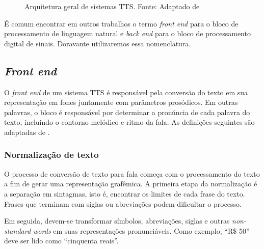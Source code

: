 \begin{figure}[!htbp]
\centering
{}
\caption[Arquitetura geral de sistemas TTS]{Arquitetura geral de sistemas TTS. Fonte: Adaptado de }
\label{fig:tts-arch}
\end{figure}

É comum encontrar em outros trabalhos o termo \emph{front end} para o
bloco de processamento de linguagem natural e \emph{back end} para o bloco de
processamento digital de sinais. Doravante utilizaremos essa nomenclatura.

\subsection{\emph{Front end}}
O \emph{front end} de um sistema TTS é responsável pela conversão do texto em
sua representação em fones juntamente com parâmetros prosódicos. Em outras
palavras, o bloco é responsável por determinar a pronúncia de cada palavra do
texto, incluindo o contorno melódico e ritmo da fala. As definições seguintes
são adaptadas de .

\subsubsection{Normalização de texto}
O processo de conversão de texto para fala começa com o processamento do texto a
fim de gerar uma representação grafêmica. A primeira etapa da normalização é a
separação em sintagmas, isto é, encontrar os limites de cada frase do texto.
Frases que terminam com siglas ou abreviações podem dificultar o processo.

Em seguida, devem-se transformar símbolos, abreviações, siglas e outras
\emph{non-standard words} em suas representações pronunciáveis. Como exemplo,
``R\$ 50'' deve ser lido como ``cinquenta reais''.

